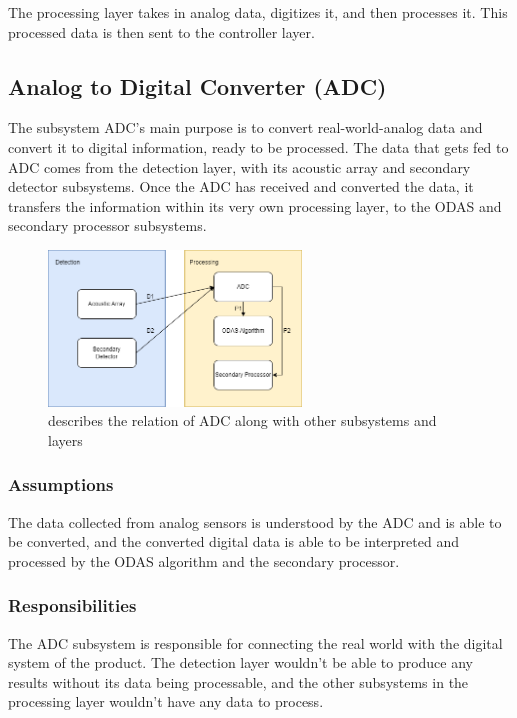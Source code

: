 The processing layer takes in analog data, digitizes it, and then processes it.  This processed data is then sent to the controller layer.

\subsection{Analog to Digital Converter (ADC)}
The subsystem ADC's main purpose is to convert real-world-analog data and convert it to digital information, ready to be processed.  The data that gets fed to ADC comes from the detection layer, with its acoustic array and secondary detector subsystems.  Once the ADC has received and converted the data, it transfers the information within its very own processing layer, to the ODAS and secondary processor subsystems.

\begin{figure}[h!]
	\centering
 	\includegraphics[width=0.60\textwidth]{images/adc_diagram.drawio}
 \caption{describes the relation of ADC along with other subsystems and layers}
\end{figure}

\subsubsection{Assumptions}
The data collected from analog sensors is understood by the ADC and is able to be converted, and the converted digital data is able to be interpreted and processed by the ODAS algorithm and the secondary processor. 

\subsubsection{Responsibilities}
The ADC subsystem is responsible for connecting the real world with the digital system of the product.  The detection layer wouldn't be able to produce any results without its data being processable, and the other subsystems in the processing layer wouldn't have any data to process. 


